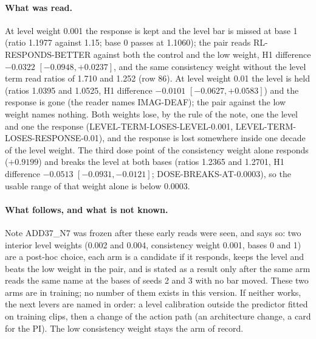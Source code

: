 \paragraph{What was read.} At level weight 0.001 the response is kept and the level bar is missed at base 1 (ratio 1.1977 against 1.15; base 0 passes at 1.1060); the pair reads RL-RESPONDS-BETTER against both the control and the low weight, H1 difference $-0.0322$ $[-0.0948,+0.0237]$, and the same consistency weight without the level term read ratios of 1.710 and 1.252 (row 86). At level weight 0.01 the level is held (ratios 1.0395 and 1.0525, H1 difference $-0.0101$ $[-0.0627,+0.0583]$) and the response is gone (the reader names IMAG-DEAF); the pair against the low weight names nothing. Both weights lose, by the rule of the note, one the level and one the response (LEVEL-TERM-LOSES-LEVEL-0.001, LEVEL-TERM-LOSES-RESPONSE-0.01), and the response is lost somewhere inside one decade of the level weight. The third dose point of the consistency weight alone responds ($+0.9199$) and breaks the level at both bases (ratios 1.2365 and 1.2701, H1 difference $-0.0513$ $[-0.0931,-0.0121]$; DOSE-BREAKS-AT-0.0003), so the usable range of that weight alone is below 0.0003.

\paragraph{What follows, and what is not known.} Note ADD37\_N7 was frozen after these early reads were seen, and says so: two interior level weights (0.002 and 0.004, consistency weight 0.001, bases 0 and 1) are a post-hoc choice, each arm is a candidate if it responds, keeps the level and beats the low weight in the pair, and is stated as a result only after the same arm reads the same name at the bases of seeds 2 and 3 with no bar moved. These two arms are in training; no number of them exists in this version. If neither works, the next levers are named in order: a level calibration outside the predictor fitted on training clips, then a change of the action path (an architecture change, a card for the PI). The low consistency weight stays the arm of record.
